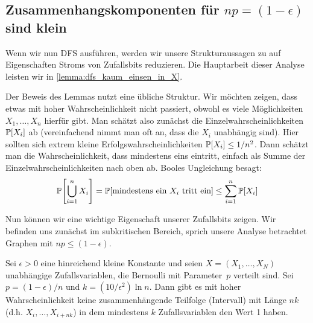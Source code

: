 \subsection{Zusammenhangskomponenten für $np = (1-\epsilon)$ sind klein}
Wenn wir nun DFS ausführen, werden wir unsere Strukturaussagen zu \Gnp auf Eigenschaften Stroms von Zufallsbits reduzieren.
Die Hauptarbeit dieser Analyse leisten wir in \cref{lemma:dfs_kaum_einsen_in_X}.

Der  Beweis des Lemmas nutzt eine übliche Struktur.
Wir möchten zeigen, dass etwas mit hoher Wahrscheinlichkeit nicht passiert, obwohl es viele Möglichkeiten $X_1, \ldots, X_n$ hierfür gibt.
Man schätzt also zunächst die Einzelwahrscheinlichkeiten~$\mathbb{P}\!\left[X_i\right]$ ab (vereinfachend nimmt man oft an, dass die $X_i$ unabhängig sind).
Hier sollten sich extrem kleine Erfolgswahrscheinlichkeiten $\mathbb{P}\!\left[X_i\right] \le 1/n^2$.
Dann schätzt man die Wahrscheinlichkeit, dass mindestens eins eintritt, einfach als Summe der Einzelwahrscheinlichkeiten nach oben ab.
Booles  Ungleichung besagt:
\begin{align}
    \mathbb{P}\!\left[\bigcup_{i=1}^n X_i\right] = \mathbb{P}\!\left[\text{mindestens ein $X_i$ tritt ein}\right] \le \sum_{i=1}^n \mathbb{P}\!\left[X_i\right]
\end{align}

\noindent
Nun können wir eine wichtige Eigenschaft unserer Zufallsbits zeigen.
Wir befinden uns zunächst im subkritischen Bereich, sprich unsere Analyse betrachtet Graphen mit $np \le (1 - \epsilon)$.

\begin{lemma}\label{lemma:dfs_kaum_einsen_in_X}
    Sei $\epsilon > 0$  eine hinreichend kleine Konstante und seien $X = (X_1, \ldots, X_N)$ unabhängige Zufallsvariablen, die Bernoulli mit Parameter~$p$ verteilt sind.
    Sei $p = (1 - \epsilon) / n$ und $k = (10 / \epsilon^2) \ln n$.
    Dann gibt es mit hoher Wahrscheinlichkeit keine zusammenhängende Teilfolge (Intervall) mit Länge $nk$ (d.h. $X_i, \ldots, X_{i+nk}$) in dem mindestens $k$ Zufallsvariablen den Wert 1 haben.

\end{lemma}


